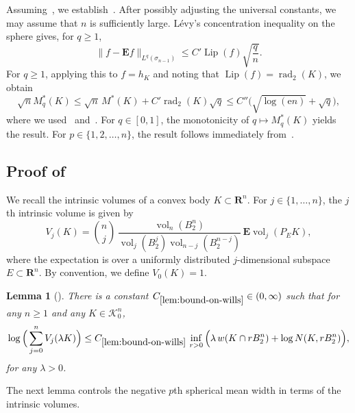 \documentclass[11pt]{amsart}
\newcommand{\R}{\mathbf R}
\newcommand{\E}{\mathbf E}
\newcommand{\Vol}{\operatorname{vol}}
\newcommand{\rad}{\operatorname{rad}_2}
\newcommand{\Lip}{\operatorname{Lip}}
\newcommand{\1}{\mathbf 1}
\newcommand{\e}{\mathrm{e}}
\newcommand{\Bodies}{\mathcal{K}_0^n}
\let\vol\Vol
\theoremstyle{plain}
\newtheorem{lemma}[theorem]{Lemma}
\begin{document}
Assuming~, we establish~. After possibly adjusting the universal constants, we may assume that $n$ is sufficiently large.
L\'{e}vy's concentration inequality on the sphere gives, for $q \geq 1$,
\[
\|f - \E f\|_{L^q(\sigma_{n-1})} \leq C' \Lip(f) \sqrt{\frac{q}{n}}.
\]
For $q \geq 1$, applying this to $f = h_K$ and noting that $\Lip(f) = \rad(K)$, we obtain
\begin{equation}\label{eqn:inequality-for-q-geq-1}
\sqrt{n} M^\ast_q(K) \leq \sqrt{n} \, M^\ast(K) + C' \rad(K) \sqrt{q}
\leq C'' \Big(\sqrt{\log(\e n)} + \sqrt{q}\Big), 
\end{equation}
where we used~ and~.
For $q \in [0, 1]$, the monotonicity of $q \mapsto M^\ast_q(K)$ yields the result. For $p \in \{1,2, \dots, n\}$, the result follows immediately from~.


\subsection{Proof of~\texorpdfstring{}{the main negative-moment estimate}}

We recall the intrinsic volumes of a convex body $K \subset \R^n$. For $j \in \{1, \dots, n\}$, the $j$th intrinsic volume is given by
\[
V_j(K) = \binom{n}{j} \, \frac{\vol_n(B^n_2)}{\vol_j(B^j_2) \vol_{n-j}(B^{n-j}_2)} \, \E \vol_j(P_EK), 
\]
where the expectation is over a uniformly distributed $j$-dimensional subspace $E \subset \R^n$. By convention, we define $V_0(K) = 1$. 
\begin{lemma}[{\cite[Corollary 4.3 and Lemma 8.2]{Mou25}}]
\label{lem:bound-on-wills}
There is a constant ${C_{\ref{lem:bound-on-wills}} \in (0, \infty)}$ such that 
for any $n \geq 1$ and any $K \in \Bodies$,
\[
\log \Big(\sum_{j=0}^n V_j(\lambda K)\Big) 
\leq C_{\ref{lem:bound-on-wills}} \, \inf_{r > 0} \Big( \lambda \, w(K \cap r B^n_2) + \log N(K, r B^n_2) 
\Big),
\]
for any $\lambda > 0$. 
\end{lemma}

The next lemma controls the negative $p$th spherical mean width in terms of the intrinsic volumes.
\end{document}
